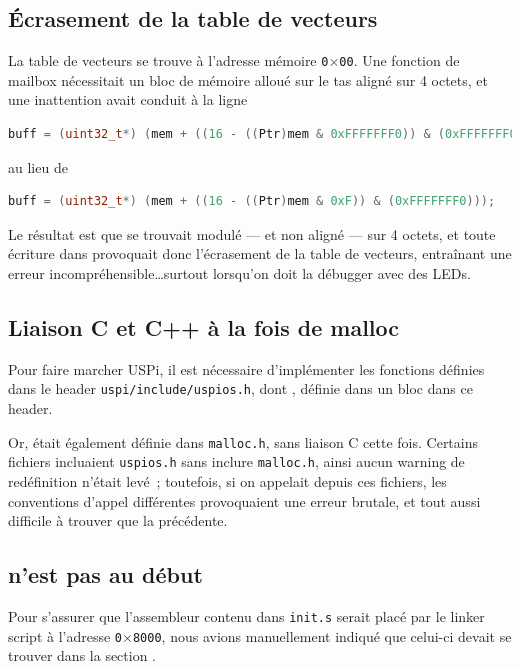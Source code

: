 \documentclass[11pt,a4paper]{article}
\newcommand{\hex}[1]{\texttt{0$\times$#1}}
\newcommand{\fname}[1]{\texttt{#1}} %
\begin{document}
\subsection*{Écrasement de la table de vecteurs}
La table de vecteurs se trouve à l'adresse mémoire \hex{00}. Une fonction de
mailbox nécessitait un bloc de mémoire alloué sur le tas aligné sur 4 octets,
et une inattention avait conduit à la ligne
\begin{lstlisting}[language=C++]
buff = (uint32_t*) (mem + ((16 - ((Ptr)mem & 0xFFFFFFF0)) & (0xFFFFFFF0)));
\end{lstlisting}

au lieu de
\begin{lstlisting}[language=C++]
buff = (uint32_t*) (mem + ((16 - ((Ptr)mem & 0xF)) & (0xFFFFFFF0)));
\end{lstlisting}

Le résultat est que  se trouvait modulé --- et non aligné --- sur 4
octets, et toute écriture dans  provoquait donc l'écrasement de la
table de vecteurs, entraînant une erreur incompréhensible\ldots surtout
lorsqu'on doit la débugger avec des LEDs.


\subsection*{Liaison C et C++ à la fois de malloc}
Pour faire marcher USPi, il est nécessaire d'implémenter les fonctions
définies dans le header \fname{uspi/include/uspios.h}, dont ,
définie dans un bloc  dans ce header. %

Or,  était également définie dans \fname{malloc.h}, sans liaison
C cette fois. Certains fichiers incluaient \fname{uspios.h} sans inclure
\fname{malloc.h}, ainsi aucun warning de redéfinition n'était levé~; toutefois,
si on appelait  depuis ces fichiers, les conventions d'appel
différentes provoquaient une erreur brutale, et tout aussi difficile à
trouver que la précédente.

\subsection*{ n'est pas au début}
Pour s'assurer que l'assembleur contenu dans \fname{init.s} serait placé par
le linker script à l'adresse \hex{8000}, nous avions manuellement indiqué
que celui-ci devait se trouver dans la section .
\end{document}
